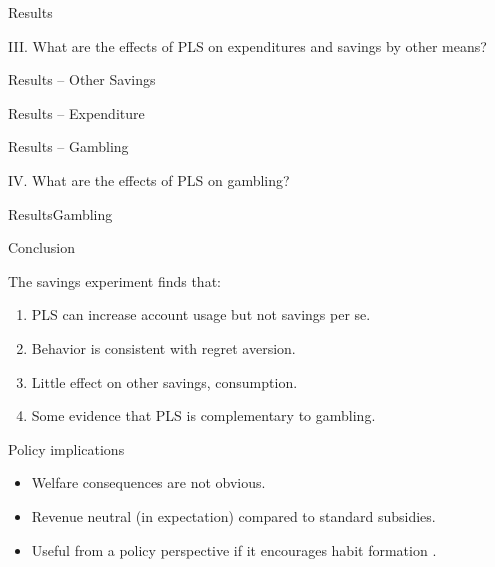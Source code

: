 \documentclass[aspectratio=169]{beamer}
\newenvironment{wideitemize}{\itemize\addtolength{\itemsep}{10pt}}{\enditemize}
\begin{document}
\begin{frame}{Results}
	
	\centering \large III. What are the effects of PLS on expenditures and savings by other means?

\end{frame}

\begin{frame}{Results -- Other Savings}

	


\end{frame}

\begin{frame}{Results -- Expenditure}

	

\end{frame}


\begin{frame}{Results -- Gambling}
	
	\centering \large IV. What are the effects of PLS on gambling?

\end{frame}

\begin{frame}{Results}{Gambling}

	


\end{frame}

\begin{frame}{Conclusion}

	\begin{wideitemize}
		\item The savings experiment finds that:
		\begin{enumerate}
			\item PLS can increase account usage but not savings per se.
			\item Behavior is consistent with regret aversion.
			\item Little effect on other savings, consumption.
			\item Some evidence that PLS is complementary to gambling.
		\end{enumerate}
		\item Policy implications
		\begin{itemize}
			\item Welfare consequences are not obvious.
			\item Revenue neutral (in expectation) compared to standard subsidies.
			\item Useful from a policy perspective if it encourages habit formation \parencite{schaner_persistent_2018}.
		\end{itemize}
	\end{wideitemize}

\end{frame}
\end{document}
